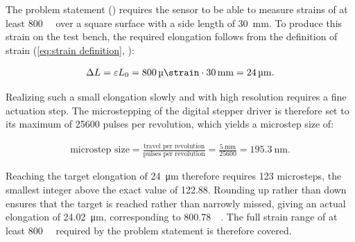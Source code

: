 The problem statement () requires the sensor to be able to measure strains of at least \SI{800}{\micro\strain} over a square surface with a side length of \SI{30}{\milli\meter}. To produce this strain on the test bench, the required elongation follows from the definition of strain (\cref{eq:strain definition}, ):

\begin{align}\label{eq:microStrain}
    \Delta L = \varepsilon L_{0} = \SI{800}{\micro\strain} \cdot \SI{30}{\milli\meter} = \SI{24}{\micro\meter}.
\end{align}

Realizing such a small elongation slowly and with high resolution requires a fine actuation step. The microstepping of the digital stepper driver is therefore set to its maximum of \num{25600} pulses per revolution, which yields a microstep size of:

\begin{align} \label{eq:microstep}
    \text{microstep size} = \frac{\text{travel per revolution}}{\text{pulses per revolution}} = \frac{\SI{5}{\milli\meter}}{\num{25600}} = \SI{195.3}{\nano\meter}.
\end{align}

Reaching the target elongation of \SI{24}{\micro\meter} therefore requires \num{123} microsteps, the smallest integer above the exact value of \num{122.88}. Rounding up rather than down ensures that the target is reached rather than narrowly missed, giving an actual elongation of \SI{24.02}{\micro\meter}, corresponding to \SI{800.78}{\micro\strain}. The full strain range of at least \SI{800}{\micro\strain} required by the problem statement is therefore covered. 